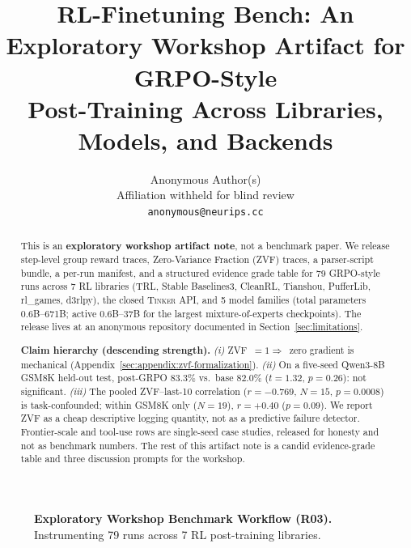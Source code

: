 \documentclass{article}
\title{RL-Finetuning Bench: An Exploratory Workshop Artifact for GRPO-Style\\
Post-Training Across Libraries, Models, and Backends}
\author{Anonymous Author(s)\\
  Affiliation withheld for blind review\\
  \texttt{anonymous@neurips.cc}}
\newcommand{\tinker}{\textsc{Tinker}}
\begin{document}
\sloppy
{}
\hfuzz=2pt

\maketitle

\begin{abstract}
This is an \textbf{exploratory workshop artifact note}, not a benchmark paper.
We release step-level group reward traces, Zero-Variance Fraction (ZVF)
traces, a parser-script bundle, a per-run manifest, and a structured evidence
grade table for 79 GRPO-style runs across 7 RL libraries (TRL, Stable
Baselines3, CleanRL, Tianshou, PufferLib, rl\_games, d3rlpy), the closed
\tinker{} API, and 5 model families (total parameters 0.6B--671B; active
0.6B--37B for the largest mixture-of-experts checkpoints). The release lives
at an anonymous repository documented in
Section~\ref{sec:limitations}.

\textbf{Claim hierarchy (descending strength).}
\textit{(i)} ZVF~$=1\Rightarrow$~zero gradient is mechanical
(Appendix~\ref{sec:appendix:zvf-formalization}).
\textit{(ii)} On a five-seed Qwen3-8B GSM8K held-out test, post-GRPO
$83.3\%$ vs.\ base $82.0\%$ ($t{=}1.32$, $p{=}0.26$): not significant.
\textit{(iii)} The pooled ZVF--last-10 correlation
($r{=}{-}0.769$, $N{=}15$, $p{=}0.0008$) is task-confounded; within
GSM8K only ($N{=}19$), $r{=}{+}0.40$ ($p{=}0.09$).
We report ZVF as a cheap descriptive logging quantity, not as a
predictive failure detector. Frontier-scale and tool-use rows are
single-seed case studies, released for honesty and not as benchmark numbers.
The rest of this artifact note is a candid evidence-grade table and three
discussion prompts for the workshop.
\end{abstract}
 
\begin{figure}[htbp]
\centering
{}
\caption{\textbf{Exploratory Workshop Benchmark Workflow (R03).} Instrumenting 79 runs across 7 RL post-training libraries.}
\label{fig:workshop_benchmark_workflow}
\end{figure}
\end{document}
